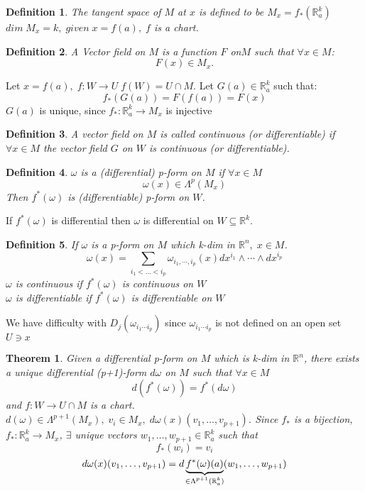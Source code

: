 \documentclass[11pt]{article}
\def\RR{\mathbb{R}}
\newtheorem{theorem}{Theorem}[section]
\newtheorem{definition}{Definition}[section]
\begin{document}
\begin{definition}
 The tangent space of $M$ at $x$ is defined to be $M_x = f_*(\RR_a^k)$ $dim\;M_x = k, \; given\; x=f(a), \;f$ is a chart.
\end{definition}

\begin{definition}
A Vector field on $M$ is a function $F$ on$M$ such that $\forall x \in M$: \[F(x) \in M_x.\] 
\end{definition}

Let $x= f(a), \; f:W \rightarrow U\;f(W) = U \cap M$. Let $G(a) \in \RR_a^k$ such that: \[f_*(G(a)) = F(f(a)) = F(x)\] $G(a)$ is unique, since $f_*:\RR_a^k \rightarrow M_x$ is injective

\begin{definition}
A vector field on $M$ is called continuous (or differentiable) if $\forall x \in M$ the vector field $G$ on $W$ is continuous (or differentiable).
\end{definition}

\begin{definition}
$\omega$ is a (differential) p-form on $M$ if $\forall x \in M$
\[\omega(x) \in \Lambda^p(M_x)\]
Then $f^*(\omega)$ is (differentiable) p-form on $W$. 
\end{definition}

If $f^*(\omega)$ is differential then $\omega$ is differential on $W \subseteq \RR^k$. 
\begin{definition}
If $\omega$ is a p-form on $M$ which k-dim in $\RR^n, \; x\in M$.
\[\omega(x) = \sum_{i_1 < \dots <i_p} \omega_{i_1, \cdots, i_p} (x) dx^{i_1} \wedge \cdots \wedge dx^{i_p} \]
$\omega$ is continuous if $f^*(\omega)$ is continuous on $W$\\
$\omega$ is differentiable if $f^*(\omega)$ is differentiable on $W$
\end{definition}
We have difficulty with $D_j(\omega_{i_1\cdots i_p})$ since $\omega_{i_1\cdots i_p}$ is not defined on an open set $U \ni x$

\begin{theorem}
Given a differential p-form on $M$ which is k-dim in $\RR^n$, there exists a unique differential (p+1)-form $d\omega$ on $M$ such that $\forall x \in M$
\[d(f^*(\omega)) = f^*(d\omega)\]
and $f:W\rightarrow U \cap M$ is a chart. $d(\omega) \in \Lambda^{p+1}(M_x), \; v_i \in M_x, \;d\omega (x)(v_1, \dots , v_{p+1})$. Since $f_*$ is a bijection, $f_*:\RR_{a}^k \rightarrow M_x$,  $\exists$ unique vectors $w_1, \dots, w_{p+1} \in \RR_{a}^k$ such that 
\[f_*(w_i) = v_i\]
\[d\omega(x)(v_1, \dots, v_{p+1}) = d\underbrace{f^*(\omega)(a)}_{\mathclap{\in \Lambda^{p+1}(\RR_a^k)}}(w_1, \dots, w_{p+1})\]
\end{theorem}
\end{document}
